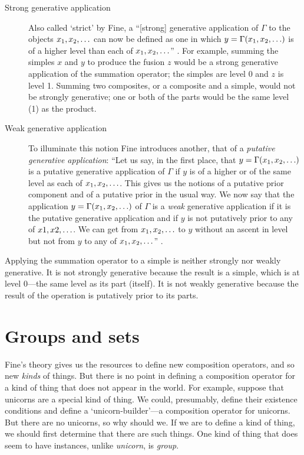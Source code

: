 \documentclass[11pt]{article}
\begin{document}
\begin{spacing}{1.5}
\begin{description}
  \item[Strong generative application] Also called `strict' by Fine, a
    ``[strong] generative application of $\Gamma$ to the objects $x_1,
    x_2, \mathellipsis$ can now be defined as one in which $y = \Gamma
    (x_1, x_2, \mathellipsis )$ is of a higher level than each of
    $x_1, x_2, \mathellipsis$'' \citeyearpar[584]{fine2010}.  For
    example, summing the simples $x$ and $y$ to produce the fusion $z$
    would be a strong generative application of the summation
    operator; the simples are level 0 and $z$ is level 1.  Summing two
    composites, or a composite and a simple, would not be strongly
    generative; one or both of the parts would be the same level (1)
    as the product.
  \item[Weak generative application] To illuminate this notion Fine
    introduces another, that of a {\em putative generative
      application}: ``Let us say, in the first place, that $y = \Gamma
    (x_1, x_2, \mathellipsis )$ is a putative generative application
    of $\Gamma$ if $y$ is of a higher or of the same level as each of
    $x_1, x_2, \mathellipsis$.  This gives us the notions of a
    putative prior component and of a putative prior in the usual way.
    We now say that the application $y = \Gamma (x_1, x_2,
    \mathellipsis )$ of $\Gamma$ is a {\em weak} generative
    application if it is the putative generative application and if
    $y$ is not putatively prior to any of $x1, x2, \mathellipsis$.  We
    can get from $x_1, x_2, \mathellipsis$ to $y$ without an ascent in
    level but not from $y$ to any of $x_1, x_2, \mathellipsis$''
    \citeyearpar[584]{fine2010}.
\end{description}

Applying the summation operator to a simple is neither strongly nor
weakly generative.  It is not strongly generative because the result
is a simple, which is at level 0---the same level as its part
(itself).  It is not weakly generative because the result of the
operation is putatively prior to its parts.

\section{Groups and sets}
\label{group}
Fine's theory gives us the resources to define new composition
operators, and so new {\em kinds} of things.  But there is no point in
defining a composition operator for a kind of thing that does not
appear in the world.  For example, suppose that unicorns are a special
kind of thing.  We could, presumably, define their existence
conditions and define a `unicorn-builder'---a composition operator for
unicorns.  But there are no unicorns, so why should we.  If we are to
define a kind of thing, we should first determine that there are such
things.  One kind of thing that does seem to have instances, unlike
{\em unicorn}, is {\em group}.


\end{spacing}
\end{document}
